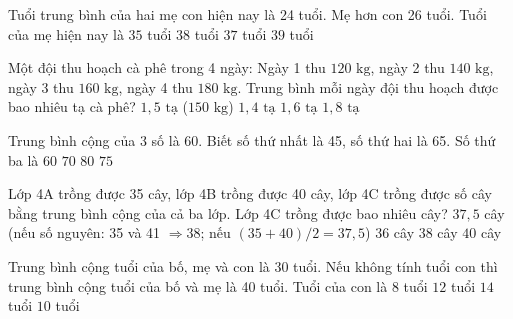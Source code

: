 \begin{ex} %
Tuổi trung bình của hai mẹ con hiện nay là 24 tuổi. Mẹ hơn con 26 tuổi. Tuổi của mẹ hiện nay là
\choice
{$35$ tuổi}
{$38$ tuổi}
{\True $37$ tuổi}
{$39$ tuổi}
\end{ex}

\begin{ex} %
Một đội thu hoạch cà phê trong 4 ngày: Ngày 1 thu $120\text{ kg}$, ngày 2 thu $140\text{ kg}$, ngày 3 thu $160\text{ kg}$, ngày 4 thu $180\text{ kg}$. Trung bình mỗi ngày đội thu hoạch được bao nhiêu tạ cà phê?
\choice
{\True $1{,}5\text{ tạ}$ ($150\text{ kg}$)}
{$1{,}4\text{ tạ}$}
{$1{,}6\text{ tạ}$}
{$1{,}8\text{ tạ}$}
\end{ex}

\begin{ex} %
Trung bình cộng của 3 số là 60. Biết số thứ nhất là 45, số thứ hai là 65. Số thứ ba là
\choice
{$60$}
{\True $70$}
{$80$}
{$75$}
\end{ex}

\begin{ex} %
Lớp 4A trồng được 35 cây, lớp 4B trồng được 40 cây, lớp 4C trồng được số cây bằng trung bình cộng của cả ba lớp. Lớp 4C trồng được bao nhiêu cây?
\choice
{\True $37{,}5$ cây (nếu số nguyên: 35 và 41 $\Rightarrow 38$; nếu $(35+40)/2 = 37{,}5$)}
{$36$ cây}
{$38$ cây}
{$40$ cây}
\end{ex}

\begin{ex} %
Trung bình cộng tuổi của bố, mẹ và con là 30 tuổi. Nếu không tính tuổi con thì trung bình cộng tuổi của bố và mẹ là 40 tuổi. Tuổi của con là
\choice
{$8$ tuổi}
{$12$ tuổi}
{$14$ tuổi}
{\True $10$ tuổi}
\end{ex}

